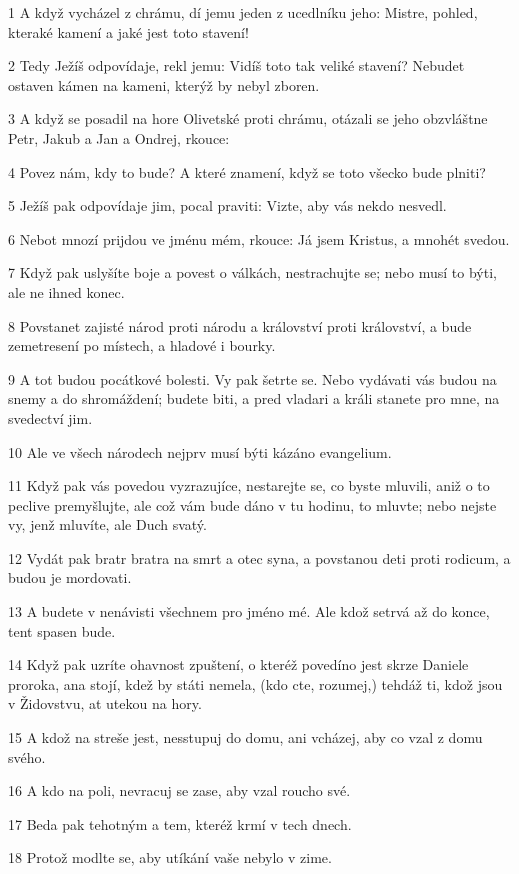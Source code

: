 \par 1 A když vycházel z chrámu, dí jemu jeden z ucedlníku jeho: Mistre, pohled, kteraké kamení a jaké jest toto stavení!
\par 2 Tedy Ježíš odpovídaje, rekl jemu: Vidíš toto tak veliké stavení? Nebudet ostaven kámen na kameni, kterýž by nebyl zboren.
\par 3 A když se posadil na hore Olivetské proti chrámu, otázali se jeho obzvláštne Petr, Jakub a Jan a Ondrej, rkouce:
\par 4 Povez nám, kdy to bude? A které znamení, když se toto všecko bude plniti?
\par 5 Ježíš pak odpovídaje jim, pocal praviti: Vizte, aby vás nekdo nesvedl.
\par 6 Nebot mnozí prijdou ve jménu mém, rkouce: Já jsem Kristus, a mnohét svedou.
\par 7 Když pak uslyšíte boje a povest o válkách, nestrachujte se; nebo musí to býti, ale ne ihned konec.
\par 8 Povstanet zajisté národ proti národu a království proti království, a bude zemetresení po místech, a hladové i bourky.
\par 9 A tot budou pocátkové bolesti. Vy pak šetrte se. Nebo vydávati vás budou na snemy a do shromáždení; budete biti, a pred vladari a králi stanete pro mne, na svedectví jim.
\par 10 Ale ve všech národech nejprv musí býti kázáno evangelium.
\par 11 Když pak vás povedou vyzrazujíce, nestarejte se, co byste mluvili, aniž o to peclive premyšlujte, ale což vám bude dáno v tu hodinu, to mluvte; nebo nejste vy, jenž mluvíte, ale Duch svatý.
\par 12 Vydát pak bratr bratra na smrt a otec syna, a povstanou deti proti rodicum, a budou je mordovati.
\par 13 A budete v nenávisti všechnem pro jméno mé. Ale kdož setrvá až do konce, tent spasen bude.
\par 14 Když pak uzríte ohavnost zpuštení, o kteréž povedíno jest skrze Daniele proroka, ana stojí, kdež by státi nemela, (kdo cte, rozumej,) tehdáž ti, kdož jsou v Židovstvu, at utekou na hory.
\par 15 A kdož na streše jest, nesstupuj do domu, ani vcházej, aby co vzal z domu svého.
\par 16 A kdo na poli, nevracuj se zase, aby vzal roucho své.
\par 17 Beda pak tehotným a tem, kteréž krmí v tech dnech.
\par 18 Protož modlte se, aby utíkání vaše nebylo v zime.

